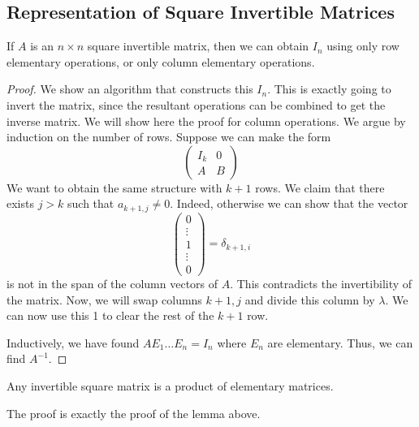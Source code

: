 \subsection{Representation of Square Invertible Matrices}
\begin{lemma}
    If \( A \) is an \( n \times n \) square invertible matrix, then we can obtain \( I_n \) using only row elementary operations, or only column elementary operations.
\end{lemma}
\begin{proof}
    We show an algorithm that constructs this \( I_n \).
    This is exactly going to invert the matrix, since the resultant operations can be combined to get the inverse matrix.
    We will show here the proof for column operations.
    We argue by induction on the number of rows.
    Suppose we can make the form
    \[ \begin{pmatrix} I_k & 0 \\ A & B \end{pmatrix} \]
    We want to obtain the same structure with \( k+1 \) rows.
    We claim that there exists \( j > k \) such that \( a_{k+1,j} \neq 0 \).
    Indeed, otherwise we can show that the vector
    \[ \begin{pmatrix} 0 \\ \vdots \\ 1 \\ \vdots \\ 0 \end{pmatrix} = \delta_{k+1,i} \]
    is not in the span of the column vectors of \( A \).
    This contradicts the invertibility of the matrix.
    Now, we will swap columns \( k+1, j \) and divide this column by \( \lambda \).
    We can now use this 1 to clear the rest of the \( k+1 \) row.

    Inductively, we have found \( A E_1 \dots E_n = I_n \) where \( E_n \) are elementary.
    Thus, we can find \( A^{-1} \).
\end{proof}
\begin{proposition}
    Any invertible square matrix is a product of elementary matrices.
\end{proposition}
The proof is exactly the proof of the lemma above.
